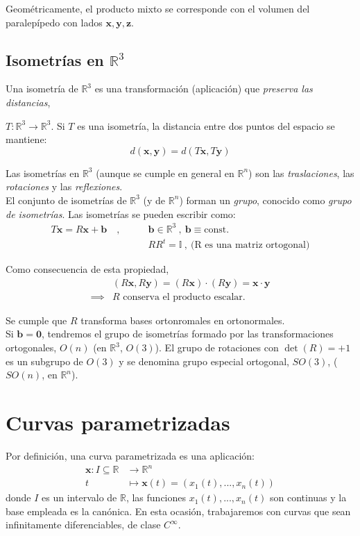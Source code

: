 Geométricamente, el producto mixto se corresponde con el volumen del paralepípedo con lados $\mathbf{x,y,z}$.

\subsection{Isometrías en $\mathbb{R}^3$}
Una isometría de $\mathbb{R}^3$ es una transformación (aplicación) que \emph{preserva las distancias},
\begin{mybox}
    $T:\mathbb{R}^3 \rightarrow \mathbb{R}^3$.
    Si $T$ es una isometría, la distancia entre dos puntos del espacio se mantiene:
    $$
    d(\mathbf{x,y})=d(T\mathbf{x},T\mathbf{y})
    $$
\end{mybox}

Las isometrías en $\mathbb{R}^3$ (aunque se cumple en general en $\mathbb{R}^n$) son las \emph{traslaciones}, las \emph{rotaciones} y las \emph{reflexiones}.\\


El conjunto de isometrías de $\mathbb{R}^3$ (y de $\mathbb{R}^n$) forman un \emph{grupo}, conocido como \emph{grupo de isometrías}. Las isometrías se pueden escribir como:
\begin{align*}
    \boxed{T\mathbf{x}=R\mathbf{x}+\mathbf{b}} \quad , \qquad
    &\mathbf{b}\in \mathbb{R}^3\ , \ \mathbf{b}\equiv \text{const.}  \\
    &RR^t=\mathbb{I} \ , \ \text{(R es una matriz ortogonal)}
\end{align*}

Como consecuencia de esta propiedad, 
\begin{align*}
   &(R\mathbf{x},R\mathbf{y})=(R\mathbf{x})\cdot (R\mathbf{y})=\mathbf{x\cdot y}\\
    \implies &R\text{ conserva el producto escalar.} 
\end{align*}

Se cumple que $R$ transforma bases ortonromales en ortonormales.\\

Si $\mathbf{b}=\mathbf{0}$, tendremos el grupo de isometrías formado por las transformaciones ortogonales, $O(n)$ (en $\mathbb{R}^3$, $O(3)$). El grupo de rotaciones con $\det(R)=+1$ es un subgrupo de $O(3)$ y se denomina grupo especial ortogonal, $SO(3)$, ($SO(n)$, en $\mathbb{R}^n$).

\section{Curvas parametrizadas}
Por definición, una curva parametrizada es una aplicación: 
\begin{align*}
    \mathbf{x}:I\subseteq\mathbb{R}&\longrightarrow \mathbb{R}^n\\
    t&\longmapsto \mathbf{x}(t)=\left ( x_1(t),...,x_n(t)\right )
\end{align*}
donde $I$ es un intervalo de $\mathbb{R}$, las funciones $x_1(t),...,x_n(t)$ son continuas y la base empleada es la canónica. En esta ocasión, trabajaremos con curvas que sean infinitamente diferenciables, de clase $C^\infty$.\\

